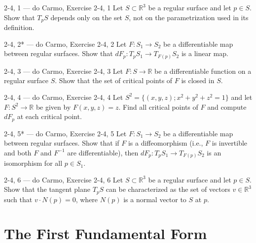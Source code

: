 \begin{exercise}{2-4, 1 — do Carmo, Exercise 2-4, 1}
Let $S \subset \mathbb{R}^3$ be a regular surface and let $p \in S$. Show that $T_pS$ depends only on the set $S$, not on the parametrization used in its definition.
\end{exercise}

\begin{exercise}{2-4, 2* — do Carmo, Exercise 2-4, 2}
Let $F: S_1 \to S_2$ be a differentiable map between regular surfaces. Show that $dF_p: T_pS_1 \to T_{F(p)}S_2$ is a linear map.
\end{exercise}

\begin{exercise}{2-4, 3 — do Carmo, Exercise 2-4, 3}
Let $F: S \to \mathbb{R}$ be a differentiable function on a regular surface $S$. Show that the set of critical points of $F$ is closed in $S$.
\end{exercise}

\begin{exercise}{2-4, 4 — do Carmo, Exercise 2-4, 4}
Let $S^2 = \{(x,y,z); x^2+y^2+z^2 = 1\}$ and let $F: S^2 \to \mathbb{R}$ be given by $F(x,y,z) = z$. Find all critical points of $F$ and compute $dF_p$ at each critical point.
\end{exercise}

\begin{exercise}{2-4, 5* — do Carmo, Exercise 2-4, 5}
Let $F: S_1 \to S_2$ be a differentiable map between regular surfaces. Show that if $F$ is a diffeomorphism (i.e., $F$ is invertible and both $F$ and $F^{-1}$ are differentiable), then $dF_p: T_pS_1 \to T_{F(p)}S_2$ is an isomorphism for all $p \in S_1$.
\end{exercise}

\begin{exercise}{2-4, 6 — do Carmo, Exercise 2-4, 6}
Let $S \subset \mathbb{R}^3$ be a regular surface and let $p \in S$. Show that the tangent plane $T_pS$ can be characterized as the set of vectors $v \in \mathbb{R}^3$ such that $v \cdot N(p) = 0$, where $N(p)$ is a normal vector to $S$ at $p$.
\end{exercise}

\section{The First Fundamental Form}\label{sec:first-fundamental-form}

